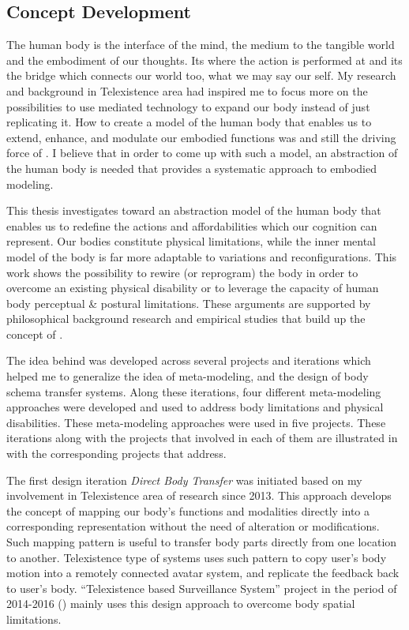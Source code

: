 \subsection{Concept Development}

The human body is the interface of the mind, the medium to the tangible world and the embodiment of our thoughts. Its where the action is performed at and its the bridge which connects our world too, what we may say our self. My research and background in Telexistence area had inspired me to focus more on the possibilities to use mediated technology to expand our body instead of just replicating it. How to create a model of the human body that enables us to extend, enhance, and modulate our embodied functions was and still the driving force of \ProposalKeyword. I believe that in order to come up with such a model, an abstraction of the human body is needed that provides a systematic approach to embodied modeling.

This thesis investigates toward an abstraction model of the human body that enables us to redefine the actions and affordabilities which our cognition can represent. Our bodies constitute physical limitations, while the inner mental model of the body is far more adaptable to variations and reconfigurations. This work shows the possibility to rewire (or reprogram) the body in order to overcome an existing physical disability or to leverage the capacity of human body perceptual \& postural limitations. These arguments are supported by philosophical background research and empirical studies that build up the concept of \ProposalKeyword.

The idea behind \ProposalKeyword was developed across several projects and iterations which helped me to generalize the idea of meta-modeling, and the design of body schema transfer systems. Along these iterations, four different meta-modeling approaches were developed and used to address body limitations and physical disabilities. These meta-modeling approaches were used in five projects. These iterations along with the projects that involved in each of them are illustrated in  with the corresponding projects that address. 

The first design iteration \textit{Direct Body Transfer} was initiated based on my involvement in Telexistence area of research since 2013. This approach develops the concept of mapping our body's functions and modalities directly into a corresponding representation without the need of alteration or modifications. Such mapping pattern is useful to transfer body parts directly from one location to another. Telexistence type of systems uses such pattern to copy user's body motion into a remotely connected avatar system, and replicate the feedback back to user's body. ``Telexistence based Surveillance System'' project in the period of 2014-2016 () mainly uses this design approach to overcome body spatial limitations.

